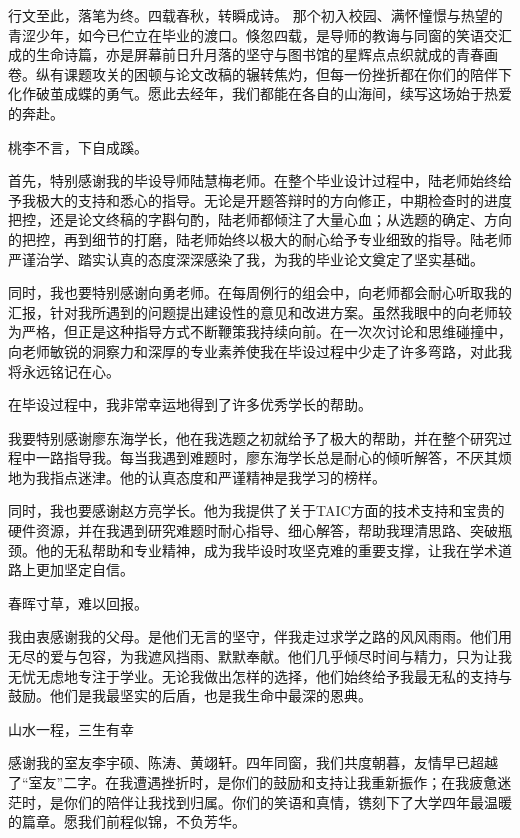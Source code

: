 \begin{acknowledgements}
行文至此，落笔为终。四载春秋，转瞬成诗。
那个初入校园、满怀憧憬与热望的青涩少年，如今已伫立在毕业的渡口。倏忽四载，是导师的教诲与同窗的笑语交汇成的生命诗篇，亦是屏幕前日升月落的坚守与图书馆的星辉点点织就成的青春画卷。纵有课题攻关的困顿与论文改稿的辗转焦灼，但每一份挫折都在你们的陪伴下化作破茧成蝶的勇气。愿此去经年，我们都能在各自的山海间，续写这场始于热爱的奔赴。

桃李不言，下自成蹊。

首先，特别感谢我的毕设导师陆慧梅老师。在整个毕业设计过程中，陆老师始终给予我极大的支持和悉心的指导。无论是开题答辩时的方向修正，中期检查时的进度把控，还是论文终稿的字斟句酌，陆老师都倾注了大量心血；从选题的确定、方向的把控，再到细节的打磨，陆老师始终以极大的耐心给予专业细致的指导。陆老师严谨治学、踏实认真的态度深深感染了我，为我的毕业论文奠定了坚实基础。

同时，我也要特别感谢向勇老师。在每周例行的组会中，向老师都会耐心听取我的汇报，针对我所遇到的问题提出建设性的意见和改进方案。虽然我眼中的向老师较为严格，但正是这种指导方式不断鞭策我持续向前。在一次次讨论和思维碰撞中，向老师敏锐的洞察力和深厚的专业素养使我在毕设过程中少走了许多弯路，对此我将永远铭记在心。

在毕设过程中，我非常幸运地得到了许多优秀学长的帮助。

我要特别感谢廖东海学长，他在我选题之初就给予了极大的帮助，并在整个研究过程中一路指导我。每当我遇到难题时，廖东海学长总是耐心的倾听解答，不厌其烦地为我指点迷津。他的认真态度和严谨精神是我学习的榜样。

同时，我也要感谢赵方亮学长。他为我提供了关于TAIC方面的技术支持和宝贵的硬件资源，并在我遇到研究难题时耐心指导、细心解答，帮助我理清思路、突破瓶颈。他的无私帮助和专业精神，成为我毕设时攻坚克难的重要支撑，让我在学术道路上更加坚定自信。

春晖寸草，难以回报。

我由衷感谢我的父母。是他们无言的坚守，伴我走过求学之路的风风雨雨。他们用无尽的爱与包容，为我遮风挡雨、默默奉献。他们几乎倾尽时间与精力，只为让我无忧无虑地专注于学业。无论我做出怎样的选择，他们始终给予我最无私的支持与鼓励。他们是我最坚实的后盾，也是我生命中最深的恩典。


山水一程，三生有幸

感谢我的室友李宇硕、陈涛、黄翊轩。四年同窗，我们共度朝暮，友情早已超越了“室友”二字。在我遭遇挫折时，是你们的鼓励和支持让我重新振作；在我疲惫迷茫时，是你们的陪伴让我找到归属。你们的笑语和真情，镌刻下了大学四年最温暖的篇章。愿我们前程似锦，不负芳华。


\end{acknowledgements}
